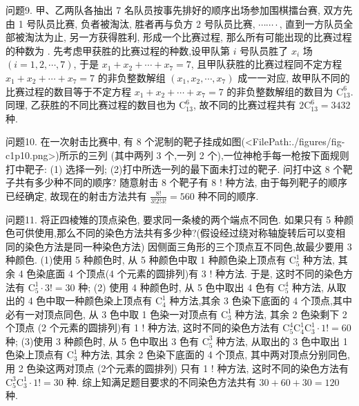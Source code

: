 问题9. 甲、乙两队各抽出 7 名队员按事先排好的顺序出场参加围棋擂台赛, 双方先由 1 号队员比赛, 负者被淘汰, 胜者再与负方 2 号队员比赛, $\cdots \cdots \cdot$, 直到一方队员全部被淘汰为止, 另一方获得胜利, 形成一个比赛过程, 那么所有可能出现的比赛过程的种数为 . 
先考虑甲获胜的比赛过程的种数,设甲队第 $i$ 号队员胜了 $x_i$ 场 $(i= 1,2, \cdots, 7)$, 于是 $x_1+x_2+\cdots+x_7=7$, 且甲队获胜的比赛过程同不定方程 $x_1+x_2+\cdots+x_7=7$ 的非负整数解组 $\left(x_1, x_2, \cdots, x_7\right)$ 成一一对应, 故甲队不同的比赛过程的数目等于不定方程 $x_1+x_2+\cdots+x_7=7$ 的非负整数解组的数目为 $\mathrm{C}_{13}^6$. 同理, 乙获胜的不同比赛过程的数目也为 $\mathrm{C}_{13}^6$, 故不同的比赛过程共有 $2 \mathrm{C}_{13}^6=3432$ 种.



问题10. 在一次射击比赛中, 有 8 个泥制的靶子挂成如图(<FilePath:./figures/fig-c1p10.png>)所示的三列 (其中两列 3 个,一列 2 个),一位神枪手每一枪按下面规则打中靶子:
(1) 选择一列;
(2)打中所选一列的最下面未打过的靶子.
问打中这 8 个靶子共有多少种不同的顺序?
随意射击 8 个靶子有 8 ! 种方法, 由于每列靶子的顺序已经确定, 故现在的射击方法共有 $\frac{8 !}{3 ! 2 ! 3 !}=560$ 种不同的顺序.



问题11. 将正四棱雉的顶点染色, 要求同一条棱的两个端点不同色.
如果只有 5 种颜色可供使用,那么不同的染色方法共有多少种?(假设经过绕对称轴旋转后可以变相同的染色方法是同一种染色方法)
因侧面三角形的三个顶点互不同色,故最少要用 3 种颜色.
(1)使用 5 种颜色时, 从 5 种颜色中取 1 种颜色染上顶点有 $\mathrm{C}_5^1$ 种方法, 其余 4 色染底面 4 个顶点(4 个元素的圆排列)有 3 ! 种方法.
于是, 这时不同的染色方法有 $\mathrm{C}_5^1 \cdot 3 !=30$ 种; (2) 使用 4 种颜色时, 从 5 色中取出 4 色有 $\mathrm{C}_5^4$ 种方法, 从取出的 4 色中取一种颜色染上顶点有 $\mathrm{C}_4^1$ 种方法,其余 3 色染下底面的 4 个顶点,其中必有一对顶点同色, 从 3 色中取 1 色染一对顶点有 $\mathrm{C}_3^1$ 种方法, 其余 2 色染剩下 2 个顶点 (2 个元素的圆排列)有 1 ! 种方法, 这时不同的染色方法有 $\mathrm{C}_5^4 \mathrm{C}_4^1 \mathrm{C}_3^1 \cdot 1 !=60$ 种; (3)使用 3 种颜色时, 从 5 色中取出 3 色有 $\mathrm{C}_5^3$ 种方法, 从取出的 3 色中取出 1 色染上顶点有 $\mathrm{C}_3^1$ 种方法, 其余 2 色染下底面的 4 个顶点, 其中两对顶点分别同色, 用 2 色染这两对顶点 (2个元素的圆排列) 只有 1 ! 种方法, 这时不同的染色方法有 $\mathrm{C}_5^3 \mathrm{C}_3^1 \cdot 1 !=30$ 种.
综上知满足题目要求的不同染色方法共有 $30+60+30=120$ 种.




